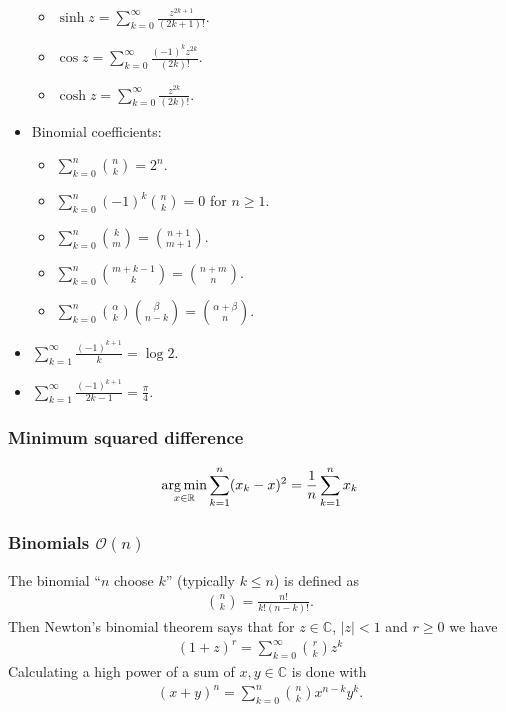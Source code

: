 \begin{itemize}
\begin{itemize}
        \item $\sinh z = \sum_{k=0}^\infty \frac{z^{2k + 1}}{(2k + 1)!}$.
        \item $\cos z = \sum_{k=0}^\infty \frac{(-1)^k z^{2k}}{(2k)!}$.
        \item $\cosh z = \sum_{k=0}^\infty \frac{z^{2k}}{(2k)!}$.
    \end{itemize}
    \item Binomial coefficients:
    \begin{itemize}
        \item $\sum_{k=0}^n \binom nk = 2^n$.
        \item $\sum_{k=0}^n (-1)^k \binom nk = 0$ for $n \geq 1$.
        \item $\sum_{k=0}^n \binom km = \binom{n+1}{m+1}$.
        \item $\sum_{k=0}^n \binom{m + k - 1}{k} = \binom{n + m}{n}$.
        \item $\sum_{k=0}^n \binom\alpha k \binom\beta{n - k} = \binom{\alpha + \beta}{n}$.
    \end{itemize}
    \item $\sum_{k=1}^\infty \frac{(-1)^{k+1}}k = \log2$.
    \item $\sum_{k=1}^\infty \frac{(-1)^{k+1}}{2k - 1} = \frac\pi4$.
\end{itemize}

\subsubsection{Minimum squared difference}
\begin{align*}
    \operatorname*{arg\,min}_{x \in \mathbb R} \sum_{k=1}^n (x_k - x)^2 = \frac1n\sum_{k=1}^n x_k
\end{align*}

\subsubsection{Binomials $\mathcal O(n)$}
The binomial ``$n$ choose $k$'' (typically $k \leq n$) is defined as
\begin{align*}
    \binom nk = \frac{n!}{k!(n - k)!}.
\end{align*}
Then Newton's binomial theorem says that for $z \in \mathbb C$, $|z| < 1$ and $r \geq 0$ we have
\begin{align*}
    (1 + z)^r = \sum_{k=0}^\infty \binom rk z^k
\end{align*}
Calculating a high power of a sum of $x, y \in \mathbb C$ is done with
\begin{align*}
    (x + y)^n = \sum_{k=0}^n \binom nk x^{n-k}y^k.
\end{align*}




